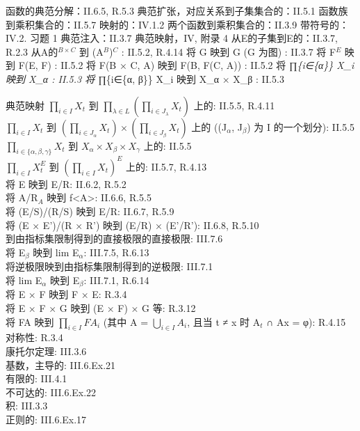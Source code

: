 函数的典范分解：II.6.5, R.5.3 典范扩张，对应关系到子集集合的：II.5.1 函数族到乘积集合的：II.5.7 映射的：IV.1.2 两个函数到乘积集合的：II.3.9 带符号的：IV.2. 习题 1 典范注入：II.3.7 典范映射，IV, 附录 4 从E的子集到E的：II.3.7, R.2.3 从A的\(^{B \times C}\) 到 (A\(^{B}\))\(^{C}\) : II.5.2, R.4.14 将 G 映到 G (G 为图) : II.3.7 将 F\(^{E}\) 映到 F(E, F) : II.5.2 将 F(B × C, A) 映到 F(B, F(C, A)) : II.5.2 将 ∏\emph{\{i∈\{α\}\} X\_i 映到 X\_α : II.5.3 将 ∏}\{i∈\{α, β\}\} X\_i 映到 X\_α × X\_β : II.5.3

典范映射 \(\prod_{i\in I}X_t\) 到 \(\prod_{\lambda \in L}\left(\prod_{i\in J_\lambda}X_t\right)\) 上的: II.5.5, R.4.11\\
\(\prod_{i\in I}X_t\) 到 \(\left(\prod_{i\in J_\alpha}X_t\right) \times \left(\prod_{i\in J_\beta}X_t\right)\) 上的 ((J\(_\alpha\), J\(_\beta\)) 为 I 的一个划分): II.5.5\\
\(\prod_{i\in \{\alpha,\beta,\gamma\}}X_t\) 到 \(X_\alpha \times X_\beta \times X_\gamma\) 上的: II.5.5\\
\(\prod_{i\in I}X_t^E\) 到 \(\left(\prod_{i\in I}X_t\right)^E\) 上的: II.5.7, R.4.13\\
将 E 映到 E/R: II.6.2, R.5.2\\
将 A/R\(_A\) 映到 f\textless A\textgreater: II.6.6, R.5.5\\
将 (E/S)/(R/S) 映到 E/R: II.6.7, R.5.9\\
将 (E × E')/(R × R') 映到 (E/R) × (E'/R'): II.6.8, R.5.10\\
到由指标集限制得到的直接极限的直接极限: III.7.6\\
将 E\(_\beta\) 映到 lim E\(_\alpha\): III.7.5, R.6.13\\
将逆极限映到由指标集限制得到的逆极限: III.7.1\\
将 lim E\(_\alpha\) 映到 E\(_\beta\): III.7.1, R.6.14\\
将 E × F 映到 F × E: R.3.4\\
将 E × F × G 映到 (E × F) × G 等: R.3.12\\
将 FA 映到 \(\prod_{i\in I}FA_i\) (其中 A = \(\bigcup_{i\in I}A_i\), 且当 t ≠ x 时 A\(_t\) ∩ Ax = φ): R.4.15\\
对称性: R.3.4\\
康托尔定理: III.3.6\\
基数，主导的: III.6.Ex.21\\
有限的: III.4.1\\
不可达的: III.6.Ex.22\\
积: III.3.3\\
正则的: III.6.Ex.17\\

